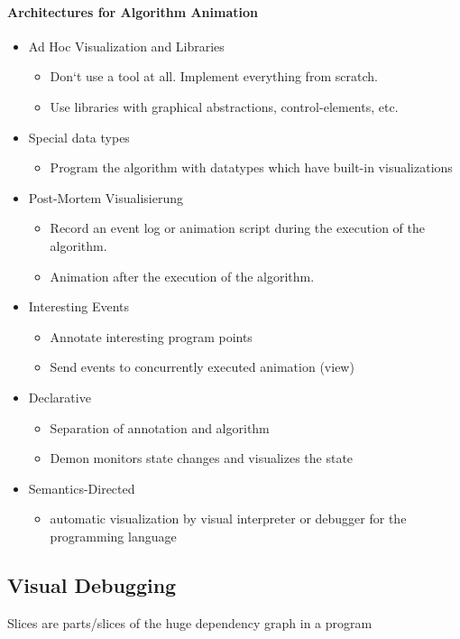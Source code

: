 \documentclass[10pt,a4paper]{article}
\begin{document}
		\paragraph{Architectures for Algorithm Animation}
		\begin{itemize}
			\item Ad Hoc Visualization and Libraries
			\begin{itemize}
				\item  Don‘t use a tool at all. Implement everything from scratch.
				\item Use libraries with graphical abstractions, control-elements, etc.
			\end{itemize}
			\item Special data types
			\begin{itemize}
				\item Program the algorithm with datatypes which have built-in visualizations
			\end{itemize}
			\item Post-Mortem Visualisierung
			\begin{itemize}
				\item Record an event log or animation script during the execution of the algorithm.
				\item Animation after the execution of the algorithm.
			\end{itemize}
			\item Interesting Events
			\begin{itemize}
				\item Annotate interesting program points
				\item Send events to concurrently executed animation (view)
			\end{itemize}
			\item Declarative
			\begin{itemize}
				\item Separation of annotation and algorithm
				\item Demon monitors state changes and visualizes the state
			\end{itemize}
			\item Semantics-Directed
			\begin{itemize}
				\item automatic visualization by visual interpreter or debugger for the programming language
			\end{itemize}
		\end{itemize}
		
		
	\subsection{Visual Debugging}
		Slices are parts/slices of the huge dependency graph in a program 
\end{document}
